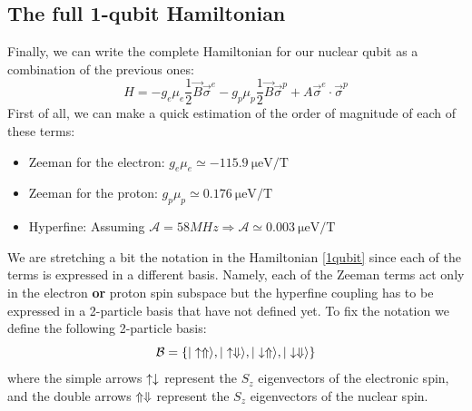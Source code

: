 \subsection{The full 1-qubit Hamiltonian}
Finally, we can write the complete Hamiltonian for our nuclear qubit as a combination of the previous ones:
\begin{equation}
  H = -g_e\mu_e\frac{1}{2}\vec{B}\vec{\sigma}^e
      -g_p\mu_p\frac{1}{2}\vec{B}\vec{\sigma}^p
      +A\vec{\sigma}^e\cdot\vec{\sigma}^p
\label{1qubit}
\end{equation}
First of all, we can make a quick estimation of the order of magnitude of each of these terms:
\begin{itemize}
  \item Zeeman for the electron: $g_e\mu_e\simeq\SI{-115.9}{\micro\eV\per\tesla}$
  \item Zeeman for the proton: $g_p\mu_p\simeq\SI{0.176}{\micro\eV\per\tesla}$
  \item Hyperfine: Assuming
  $\mathcal{A}=58MHz\Rightarrow\mathcal{A}\simeq\SI{0.003}{\micro\eV\per\tesla}$
\end{itemize}
We are stretching a bit the notation in the Hamiltonian \eqref{1qubit} since each of the terms is expressed in a different basis. Namely, each of the Zeeman terms act only in the electron \textbf{or} proton spin subspace but the hyperfine coupling has to be expressed in a 2-particle basis that have not defined yet.
To fix the notation we define the following 2-particle basis:
\begin{equation}
  \mathcal{B}=\left\{|\uparrow\Uparrow\rangle,|\uparrow\Downarrow\rangle,
                     |\downarrow\Uparrow\rangle,|\downarrow\Downarrow\rangle\right\}
\label{basis}
\end{equation}
where the simple arrows $\uparrow\downarrow$ represent the $S_z$ eigenvectors of the electronic spin, and the double arrows $\Uparrow\Downarrow$ represent the $S_z$ eigenvectors of the nuclear spin.

